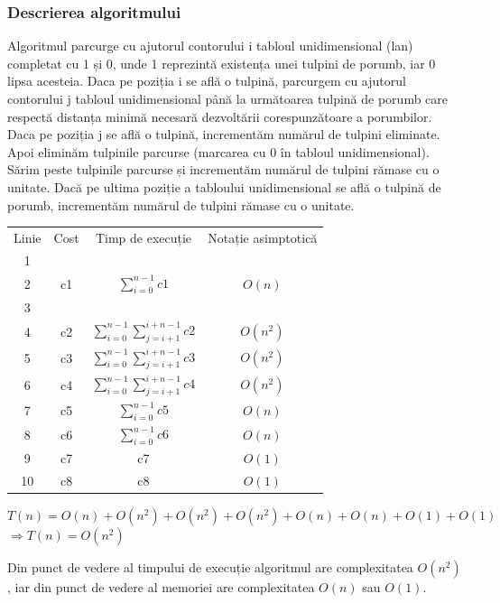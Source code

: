 \documentclass[11pt,a4paper]{article}
\begin{document}
    \subsubsection{\large Descrierea algoritmului}    
    Algoritmul parcurge cu ajutorul contorului i tabloul unidimensional (lan) completat cu 1 și 0, unde 1 reprezintă existența unei tulpini de porumb, iar 0 lipsa acesteia. Daca pe poziția i se află o tulpină, parcurgem cu ajutorul contorului j tabloul unidimensional până la următoarea tulpină de porumb care respectă distanța minimă necesară dezvoltării corespunzătoare a porumbilor. Daca pe poziția j se află o tulpină, incrementăm numărul de tulpini eliminate. Apoi eliminăm tulpinile parcurse (marcarea cu 0 în tabloul unidimensional). Sărim peste tulpinile parcurse și incrementăm numărul de tulpini rămase cu o unitate. Dacă pe ultima poziție a tabloului unidimensional se află o tulpină de porumb, incrementăm numărul de tulpini rămase cu o unitate.
    
\begin{center}
\begin{tabular}{ c c c c}
 Linie & Cost & Timp de execuție  & Notație asimptotică  \\ 
 1 \\  
 2 & c1 & $\sum\limits_{i=0}^{n-1}c1$ & $O(n)$ \\
 3 \\
 4 & c2 & $\sum\limits_{i=0}^{n-1}\sum\limits_{j=i+1}^{i+n-1}c2$ & $O(n^2)$ \\
 5 & c3 & $\sum\limits_{i=0}^{n-1}\sum\limits_{j=i+1}^{i+n-1}c3$ & $O(n^2)$ \\
 6 & c4 & $\sum\limits_{i=0}^{n-1}\sum\limits_{j=i+1}^{i+n-1}c4$ & $O(n^2)$ \\
 7 & c5 & $\sum\limits_{i=0}^{n-1}c5$ & $O(n)$ \\
 8 & c6 & $\sum\limits_{i=0}^{n-1}c6$ & $O(n)$ \\
 9 & c7 & c7 & $O(1)$ \\
 10 & c8 & c8 & $O(1)$
\end{tabular}
\end{center}

$T(n) = O(n)+O(n^2)+O(n^2)+O(n^2)+O(n)+O(n)+O(1)+O(1)$ \\
$\Longrightarrow T(n)=O(n^2)$ 

Din punct de vedere al timpului de execuție algoritmul are complexitatea $O(n^2)$, iar din punct de vedere al memoriei are complexitatea $O(n)$ sau $O(1)$.

\vspace{5cm}
\end{document}
